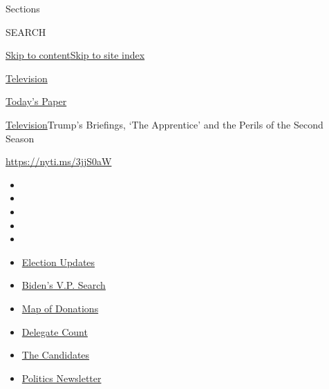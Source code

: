 Sections

SEARCH

\protect\hyperlink{site-content}{Skip to
content}\protect\hyperlink{site-index}{Skip to site index}

\href{https://www.nytimes3xbfgragh.onion/section/arts/television}{Television}

\href{https://myaccount.nytimes3xbfgragh.onion/auth/login?response_type=cookie\&client_id=vi}{}

\href{https://www.nytimes3xbfgragh.onion/section/todayspaper}{Today's
Paper}

\href{/section/arts/television}{Television}\textbar{}Trump's Briefings,
`The Apprentice' and the Perils of the Second Season

\url{https://nyti.ms/3jjS0aW}

\begin{itemize}
\item
\item
\item
\item
\item
\end{itemize}

\begin{itemize}
\item
  \href{https://www.nytimes3xbfgragh.onion/2020/07/31/us/elections/biden-vs-trump.html?action=click\&pgtype=Article\&state=default\&region=TOP_BANNER\&context=storylines_menu}{Election
  Updates}
\item
  \href{https://www.nytimes3xbfgragh.onion/article/biden-vice-president-2020.html?action=click\&pgtype=Article\&state=default\&region=TOP_BANNER\&context=storylines_menu}{Biden's
  V.P. Search}
\item
  \href{https://www.nytimes3xbfgragh.onion/interactive/2020/07/24/us/politics/trump-biden-campaign-donors.html?action=click\&pgtype=Article\&state=default\&region=TOP_BANNER\&context=storylines_menu}{Map
  of Donations}
\item
  \href{https://www.nytimes3xbfgragh.onion/interactive/2020/us/elections/delegate-count-primary-results.html?action=click\&pgtype=Article\&state=default\&region=TOP_BANNER\&context=storylines_menu}{Delegate
  Count}
\item
  \href{https://www.nytimes3xbfgragh.onion/interactive/2019/us/politics/2020-presidential-candidates.html?action=click\&pgtype=Article\&state=default\&region=TOP_BANNER\&context=storylines_menu}{The
  Candidates}
\item
  \href{https://www.nytimes3xbfgragh.onion/newsletters/politics?action=click\&pgtype=Article\&state=default\&region=TOP_BANNER\&context=storylines_menu}{Politics
  Newsletter}
\end{itemize}

